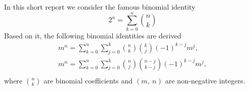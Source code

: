 In this short report we consider the famous binomial identity
\[
    2^n = \sum_{k=0}^{n}\binom{n}{k}
\]
Based on it, the following binomial identities are derived
\begin{gather*}
    m^n = \sum_{k=0}^{n} \sum_{j=0}^{k} \binom{n}{k} \binom{k}{j} (-1)^{k-j} m^j,\\
    m^n = \sum_{k=0}^{n} \sum_{j=0}^{k} \binom{n}{j} \binom{n-j}{k-j} (-1)^{k-j} m^j,\\
\end{gather*}
where $\binom{n}{k}$ are binomial coefficients and $(m, \ n)$ are non-negative integers.
